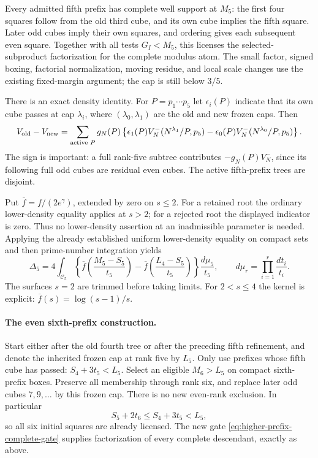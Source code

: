 \documentclass[11pt]{article}
\begin{document}
Every admitted fifth prefix has complete well support at $M_5$:
the first four squares follow from the old third cube, and its own
cube implies the fifth square. Later odd cubes imply their own
squares, and ordering gives each subsequent even square. Together
with all tests $G_I<M_5$, this licenses the selected-subproduct
factorization for the complete modulus atom. The small factor,
signed boxing, factorial normalization, moving residue, and local
scale changes use the existing fixed-margin argument; the cap is
still below $3/5$.

There is an exact density identity. For $P=p_1\cdots p_5$ let
$\epsilon_i(P)$ indicate that its own cube passes at cap
$\lambda_i$, where $(\lambda_0,\lambda_1)$ are the old and new
frozen caps. Then
\begin{equation}\label{eq:rank5-exact-density}
 V_{\rm old}-V_{\rm new}
 =\sum_{\text{active }P}g_N(P)
 \left\{\epsilon_1(P)V_N^-(N^{\lambda_1}/P,p_5)
       -\epsilon_0(P)V_N^-(N^{\lambda_0}/P,p_5)\right\}.
\end{equation}
The sign is important: a full rank-five subtree contributes
$-g_N(P)V_N^-$, since its following full odd cubes are residual
even cubes. The active fifth-prefix trees are disjoint.

Put $\overline f=f/(2e^\gamma)$, extended by zero on $s\le2$.
For a retained root the ordinary lower-density equality applies
at $s>2$; for a rejected root the displayed indicator is zero.
Thus no lower-density assertion at an inadmissible parameter is
needed. Applying the already established uniform lower-density
equality on compact sets and then prime-number integration yields
\begin{equation}\label{eq:rank5-density-gain}
 \Delta_5=4\int_{\mathcal C_5}
 \left\{\overline f\left(\frac{M_5-S_5}{t_5}\right)
       -\overline f\left(\frac{L_4-S_5}{t_5}\right)\right\}
 \frac{d\mu_5}{t_5},\qquad
 d\mu_r=\prod_{i=1}^r\frac{dt_i}{t_i}.
\end{equation}
The surfaces $s=2$ are trimmed before taking limits. For
$2<s\le4$ the kernel is explicit:
$\overline f(s)=\log(s-1)/s$.

\paragraph{The even sixth-prefix construction.}
Start either after the old fourth tree or after the preceding
fifth refinement, and denote the inherited frozen cap at rank
five by $L_5$. Only use prefixes whose fifth cube has passed:
$S_4+3t_5<L_5$. Select an eligible $M_6>L_5$ on compact
sixth-prefix boxes. Preserve all membership through rank six,
and replace later odd cubes $7,9,\ldots$ by this frozen cap.
There is no new even-rank exclusion. In particular
\[
 S_5+2t_6\le S_4+3t_5<L_5,
\]
so all six initial squares are already licensed. The new gate
\eqref{eq:higher-prefix-complete-gate} supplies factorization of
every complete descendant, exactly as above.
\end{document}
